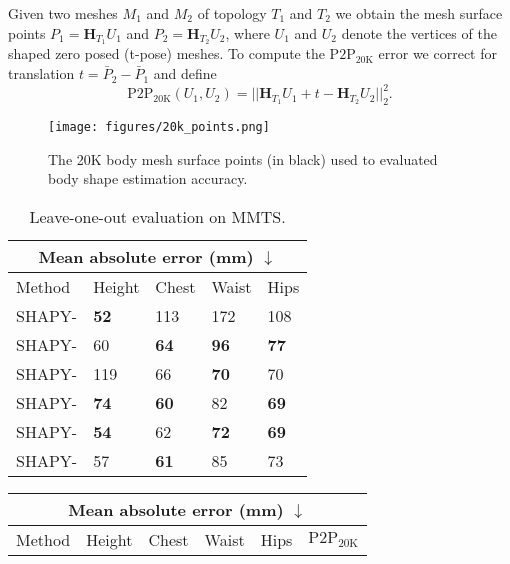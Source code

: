 \documentclass[10pt,twocolumn,letterpaper]{article}
\newcommand{\modelCOLOR}{black}
\newcommand{\modelname}{{\color{\modelCOLOR}SHAPY}\xspace}
\newcommand{\colorattr}{\color{PineGreen}}
\newcommand{\colorheight}{\color{Bittersweet}}
\newcommand{\colorcirc}{\color{OrangeRed}}
\newcommand{\heightVar}[0]{{\colorheight{H}}}
\newcommand{\attrVar}[0]{{\colorattr{A}}}
\newcommand{\circVar}[0]{{\colorcirc{C}}}
\newcommand{\mmts}{MMTS\xspace}
\newcommand{\vspaceTABaboveCaption}{-0.0 em}
\newcommand{\vtovHD}{\mbox{$\text{P2P}_{20\text{K}}$}\xspace}
\newcommand{\myarraystretch}[0]{1.1}
\begin{document}
\begin{appendices}
Given two meshes $M_1$ and $M_2$ of topology $T_1$ and $T_2$ we obtain the mesh surface points $P_1 = \mathbf{H}_{T_1} U_1$ and $P_2 = \mathbf{H}_{T_2} U_2$, where $U_1$ and $U_2$ denote the vertices of the shaped zero posed (t-pose) meshes.
To compute the \vtovHD error we correct for translation $t = \bar P_2 - \bar P_1$ and define $$ \vtovHD(U_1, U_2) = || \mathbf{H}_{T_1} U_1 + t - \mathbf{H}_{T_2} U_2 ||_2^2 \text{.}$$


 \begin{figure}[t!]
    \centering \texttt{[image: figures/20k\_points.png]}
    \caption{The 20K body mesh surface points (in black) used to evaluated body shape
        estimation accuracy.}
    \label{fig:mesh_surface_points}
\end{figure} 

\begin{table}[t!]
    \renewcommand{\arraystretch}{\myarraystretch}
    \centering
    \scriptsize
    \begin{tabular}{lllll}
        \toprule
        \multicolumn{5}{c}{Mean absolute error (mm) $\downarrow$}                                     \\
        \midrule   Method                                & Height      & Chest       & Waist       & Hips        \\

        \modelname-\heightVar                 & \textbf{52} & 113         & 172         & 108         \\
        \modelname-\heightVar\attrVar         & 60          & \textbf{64} & \textbf{96} & \textbf{77} \\ \modelname-\circVar                   & 119         & 66          & \textbf{70} & 70          \\
        \modelname-\circVar\attrVar           & \textbf{74} & \textbf{60} & 82          & \textbf{69} \\ \modelname-\heightVar\circVar         & \textbf{54} & 62          & \textbf{72} & \textbf{69} \\
        \modelname-\heightVar\circVar\attrVar & 57          & \textbf{61} & 85          & 73          \\
        \bottomrule
    \end{tabular}
    \vspace{\vspaceTABaboveCaption}
    \caption{
        Leave-one-out evaluation on \mmts.}
    \label{tab:mmts_leave_one_out}
\end{table} \begin{table}[t!]
    \renewcommand{\arraystretch}{\myarraystretch}
    \centering
    \scriptsize
    \begin{tabular}{llllll}
        \toprule
        \multicolumn{6}{c}{Mean absolute error (mm) $\downarrow$}                                                   \\
        \midrule
        Method                                & Height      & Chest       & Waist       & Hips        & \vtovHD     \\


\end{tabular}
\end{table}
\end{appendices}
\end{document}
